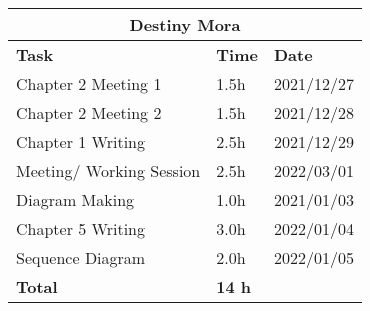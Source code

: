 \begin{table}[H]
\centering
\begin{tabular}{|p{}|p{}|p{}|}
\hline
\multicolumn{3}{|c|}{\textbf{Destiny Mora}}\\\hline
\textbf{Task} & \textbf{Time} & \textbf{Date}\\\hline
Chapter 2 Meeting 1 & 1.5h & 2021/12/27\\\hline
Chapter 2 Meeting 2 & 1.5h & 2021/12/28\\\hline
Chapter 1 Writing & 2.5h & 2021/12/29\\\hline
Meeting/ Working Session & 2.5h & 2022/03/01\\\hline
Diagram Making & 1.0h & 2021/01/03\\\hline
Chapter 5 Writing & 3.0h & 2022/01/04\\\hline
Sequence Diagram & 2.0h & 2022/01/05\\\hline
\textbf{Total} & \textbf{14 h} &\\\hline
\end{tabular}
\end{table}
